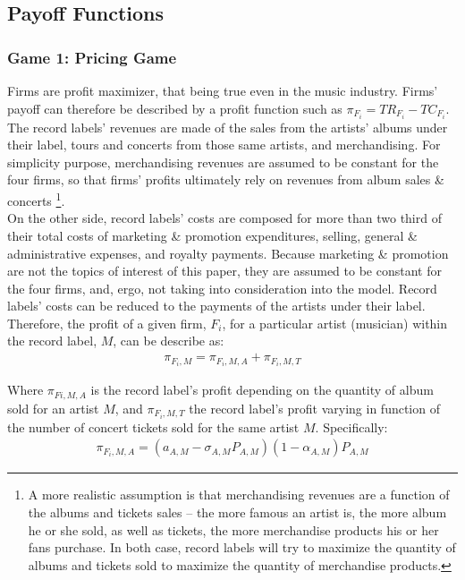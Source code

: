 \documentclass[a4paper,12pt]{article}
\numberwithin{equation}{section}
\begin{document}
\subsection{Payoff Functions}

\subsubsection{Game 1: Pricing Game}

Firms are profit maximizer, that being true even in the music industry. Firms' payoff can therefore be described by a profit function such as $\pi_{F_i} = TR_{F_i} - TC_{F_i}$.\\

The record labels' revenues are made of the sales from the artists' albums under their label, tours and concerts from those same artists, and merchandising. For simplicity purpose, merchandising revenues are assumed to be constant for the four firms, so that firms' profits ultimately rely on revenues from album sales \& concerts \footnote{
A more realistic assumption is that merchandising revenues are a function of the albums and tickets sales – the more famous an artist is, the more album he or she sold, as well as tickets, the more merchandise products his or her fans purchase. In both case, record labels will try to maximize the quantity of albums and tickets sold to maximize the quantity of merchandise products.
}.\\

On the other side, record labels' costs are composed for more than two third of their total costs of marketing \& promotion expenditures, selling, general \& administrative expenses, and royalty payments. Because marketing \& promotion are not the topics of interest of this paper, they are assumed to be constant for the four firms, and, ergo, not taking into consideration into the model. Record labels' costs can be reduced to the payments of the artists under their label.\\

Therefore, the profit of a given firm, $F_i$, for a particular artist (musician) within the record label, $M$, can be describe as:
\begin{eqnarray}
\pi_{F_i, M} = \pi_{F_i, M, A} + \pi_{F_i, M, T}
\label{Eq:FirmTotalPayoff}
\end{eqnarray}  

Where $\pi_{Fi, M, A}$ is the record label's profit depending on the quantity of album sold for an artist $M$, and $\pi_{F_i, M, T}$ the record label's profit varying in function of the number of concert tickets sold for the same artist $M$. Specifically:
\begin{eqnarray}
\pi_{F_i, M, A} = (a_{A, M} - \sigma_{A, M} P_{A, M})(1 - \alpha_{A, M}) P_{A, M}
\label{Eq:FirmAlbumPayoff}
\end{eqnarray}
\end{document}
